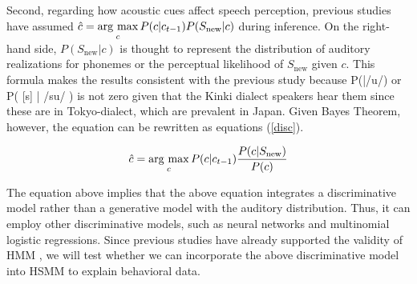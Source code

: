 \documentclass[a4paper,11pt,twocolumn]{article}
\newcommand{\argmax}{\mathop{\rm arg~max}\limits}
\begin{document}
Second, regarding how acoustic cues affect speech perception, previous studies \cite{wilson2013bayesian, kishiyama2021influence} have assumed 
$\hat{c} = \argmax_{c} P(c | c_{t-1})P(S_{\text{new}}|c)$
during inference. On the right-hand side, $P(S_{\text{new}}|c)$ is thought to represent the distribution of auditory realizations for phonemes or the perceptual likelihood of $S_{\text{new}}$ given $c$. This formula makes the results consistent with the previous study because P(\textsubring{\textturnm}|/u/) or P( [s] | /su/ ) is not zero given that the Kinki dialect speakers hear them since these are in Tokyo-dialect, which are prevalent in Japan. Given Bayes Theorem, however, the equation can be rewritten as equations (\ref{disc}).


\begin{equation} \label{disc}
    \hat{c} = \argmax_{c} P(c | c_{t-1}) \frac{P(c|S_{\text{new}})}{P(c)}
\end{equation}

The equation above implies that the above equation integrates a discriminative model rather than a generative model with the auditory distribution. Thus, it can employ other discriminative models, such as neural networks and multinomial logistic regressions. Since previous studies have already supported the validity of HMM \cite{kishiyama2021influence}, we will test whether we can incorporate the above discriminative model into HSMM to explain behavioral data.




\end{document}
